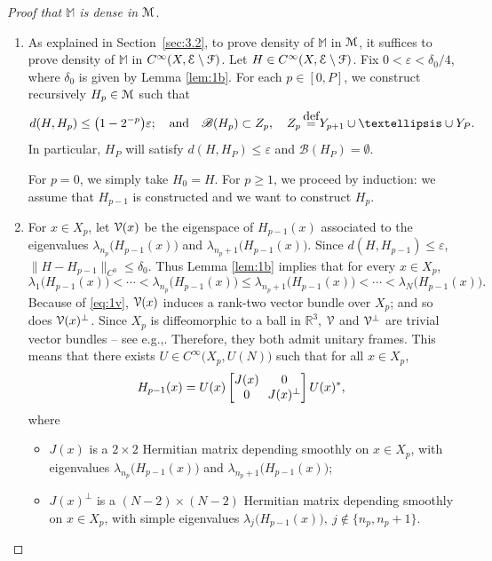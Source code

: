 \documentclass[11pt]{article}
\newcommand{\eg}{e.g.,\xspace}
\newcommand{\skpt}{\smallskip}
\numberwithin{equation}{section}
\let\mathcal\mathscr
\let\pazocal\EuScript
\theoremstyle{definition}
\newcommand{\FF}{\pazocal{F}}
\newcommand{\VV}{{\pazocal{V}}}
\newcommand{\EE}{\pazocal{E}}
\newcommand{\MM}{\pazocal{M}}
\newcommand{\BB}{\mathcal{B}}
\newcommand{\R}{\mathbb{R}}
\newcommand{\Mm}{\mathbb{M}}
\let\epsi\varepsilon
\newcommand{\matrice}[1]{\arraycolsep3.5pt\begin{bmatrix}#1\end{bmatrix}}
\newcommand{\de}{\,\mathrel{\stackrel{\makebox[0pt]{\mbox{\normalfont\tiny def}}}{=}}}
\begin{document}
\skpt
\begin{proof}[Proof that $\Mm$ is dense in $\MM$]
\begin{enumerate}
\item
As explained in Section~\ref{sec:3.2}, to prove density of $\Mm$ in $\MM$, it suffices to prove density of $\Mm$ in $C^\infty(X,\EE \setminus \FF)$. Let $H \in C^\infty(X,\EE \setminus \FF)$.
Fix $0 < \epsi < \delta_0/4$, where $\delta_0$ is given by Lemma \ref{lem:1b}. For each $p \in [0,P]$, we construct recursively $H_p \in \MM$ such that
\begin{equation*}
d(H, H_p) \leq \bigl(1-2^{-p}\bigr) \epsi ; \quad\text{and}\quad \BB(H_p) \subset Z_p, \quad Z_p \de Y_{p+1} \cup \dots \cup Y_P.
\end{equation*}
In particular, $H_P$ will satisfy $d(H,H_P) \leq \epsi$ and $\BB(H_P) = \emptyset$.

For $p=0$, we simply take $H_0 = H$. For $p \geq 1$, we proceed by induction: we assume that $H_{p-1}$ is constructed and we want to construct $H_p$.

\item
For $x \in X_p$, let $\VV(x)$ be the eigenspace of $H_{p-1}(x)$ associated to the eigenvalues $\lambda_{n_p}\bigl( H_{p-1}(x) \bigr)$ and $\lambda_{n_p+1}\bigl( H_{p-1}(x) \bigr)$. Since $d(H, H_{p-1}) \leq \epsi$, $\| H-H_{p-1}\|_{C^0} \leq \delta_0$. Thus Lemma \ref{lem:1b} implies that for every $x \in X_p$,
\begin{equation}\label{eq:1v}
\lambda_1\bigl( H_{p-1}(x) \bigr) \!<\! \cdots \!<\! \lambda_{n_p}\bigl( H_{p-1}(x) \bigr) \!\leq\! \lambda_{n_p+1}\bigl( H_{p-1}(x) \bigr) \!<\! \cdots \!<\! \lambda_N\bigl( H_{p-1}(x) \bigr).
\end{equation}
Because of \eqref{eq:1v}, $\VV(x)$ induces a rank-two vector bundle over $X_p$; and so does $\VV(x)^\perp$. Since $X_p$ is diffeomorphic to a ball in $\R^3$, $\VV$ and $\VV^\perp$ are trivial vector bundles -- see \eg \cite[\S1.3]{M01}. Therefore, they both admit unitary frames. This means that there exists $U \in C^\infty\bigl(X_p,U(N)\bigr)$ such that for all $x \in X_p$,
\begin{equation}\label{eq:1u}
H_{p-1}(x) = U(x) \matrice{J(x) & 0 \\ 0 & J(x)^\perp} U(x)^*,
\end{equation}
where
\begin{itemize}
\item $J(x)$ is a $2 \times 2$ Hermitian matrix depending smoothly on $x \in X_p$, with eigenvalues $\lambda_{n_p}\bigl( H_{p-1}(x) \bigr)$ and $\lambda_{n_p+1}\bigl( H_{p-1}(x) \bigr)$;
\item $J(x)^\perp$ is a $(N-2) \times (N-2)$ Hermitian matrix depending smoothly on $x \in X_p$, with simple eigenvalues $\lambda_j\bigl( H_{p-1}(x) \bigr), \ j \notin\{ n_p, n_p+1\}$.
\end{itemize}


\end{enumerate}
\end{proof}
\end{document}
